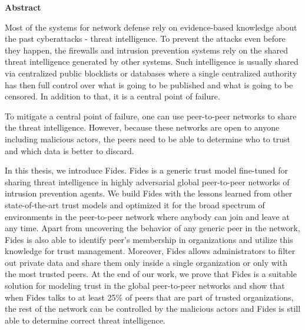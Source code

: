 \newenvironment{abstractpage}
  {\cleardoublepage\thispagestyle{empty}}
  {\vfill\cleardoublepage}
\newenvironment{abstract}[1]
  {\bigskip
   \begin{center}\bfseries#1\end{center}\small\leftskip=0.5cm\rightskip=0.5cm}
  {\par\bigskip}

\providecommand{\keywords}[2]{\footnotesize\textbf{\textit{#1:}} #2}

\begin{abstractpage}
\begin{abstract}{Abstract}

Most of the systems for network defense rely on evidence-based knowledge about the past cyberattacks - threat intelligence. To prevent the attacks even before they happen, the firewalls and intrusion prevention systems rely on the shared threat intelligence generated by other systems.
Such intelligence is usually shared via centralized public blocklists or databases where a single centralized authority has then full control over what is going to be published and what is going to be censored. In addition to that, it is a central point of failure.

To mitigate a central point of failure, one can use peer-to-peer networks to share the threat intelligence. However, because these networks are open to anyone including malicious actors, the peers need to be able to determine who to trust and which data is better to discard.

In this thesis, we introduce Fides. Fides is a generic trust model fine-tuned for sharing threat intelligence in highly adversarial global peer-to-peer networks of intrusion prevention agents.
We build Fides with the lessons learned from other state-of-the-art trust models and optimized it for the broad spectrum of environments in the peer-to-peer network where anybody can join and leave at any time.
Apart from uncovering the behavior of any generic peer in the network, Fides is also able to identify peer's membership in organizations and utilize this knowledge for trust management.
Moreover, Fides allows administrators to filter out private data and share them only inside a single organization or only with the most trusted peers. 
At the end of our work, we prove that Fides is a suitable solution for modeling trust in the global peer-to-peer networks and show that when Fides talks to at least 25\% of peers that are part of trusted organizations, the rest of the network can be controlled by the malicious actors and Fides is still able to determine correct threat intelligence.


\end{abstract}
\end{abstractpage}
